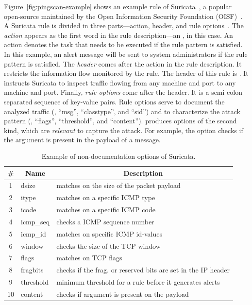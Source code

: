 \documentclass[conference]{IEEEtran}
\begin{document}
Figure~\ref{fig:pingscan-example} shows an example rule of
Suricata~\cite{suricata}, a popular open-source \nids{} maintained by
the Open Information Security Foundation (OISF)~\cite{oisf}.  A
Suricata rule is divided in three parts---action, header, and rule
options~\cite{suri-rule-format}. The \emph{action} appears as the
first word in the rule description---an , in this
case. An action denotes the task that needs to be executed if the
rule pattern is satisfied.  In this example, an alert message will be
sent to system administrators if the rule pattern is
satisfied. The \emph{header} comes after the
action in the rule description. It restricts the information flow
monitored by the rule. The header of this rule is . It instructs Suricata to inspect  traffic
flowing from any machine and port to any machine and port. Finally, \emph{rule options} come after the
header. It is a semi-colon-separated sequence of key-value pairs. Rule
options serve to document the analyzed traffic (\eg{}, ``msg'',
``classtype'', and ``sid'') and to characterize the attack pattern
(\eg, ``flags'', ``threshold'', and ``content''). \tname{} produces
options of the second kind, which are \emph{relevant} to capture the
attack. For example, the option  checks if the
argument is present in the payload of a message.

\begin{table}[t!]
  \footnotesize
  \caption{\label{table:rules}Example of non-documentation options of Suricata.}
  \vspace{-2ex}
  \centering
  \begin{tabular}{clp{6cm}}
    \toprule
    \multicolumn{1}{c}{\#} & \multicolumn{1}{c}{Name} &  \multicolumn{1}{c}{Description}\\
    \midrule     
    1 & dsize & matches on the size of the packet payload\\
    2 & itype &  matches on a specific ICMP type\\
    3 & icode & matches on a specific ICMP code\\
    4 & icmp\_seq  & checks a ICMP sequence number\\
    5 & icmp\_id & matches on specific ICMP id-values\\
    6 & window & checks the size of the TCP window\\
    7 & flags & matches on TCP flags\\
    8 & fragbits & checks if the frag. or reserved bits are set in the IP header\\
    9 & threshold & minimum threshold for a rule before it generates alerts\\
    10 & content & checks if argument is present on the payload\\
    \bottomrule
  \end{tabular}
  \vspace{-3ex}  
\end{table}
\end{document}
